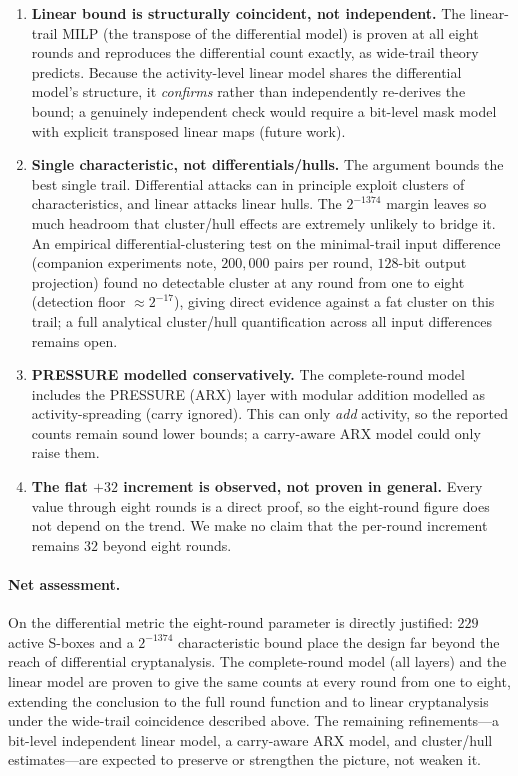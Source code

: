 \documentclass[11pt,a4paper]{article}
\begin{document}
\begin{enumerate}\itemsep3pt
  \item \textbf{Linear bound is structurally coincident, not independent.} The
        linear-trail MILP (the transpose of the differential model) is proven at
        all eight rounds and reproduces the differential count exactly, as
        wide-trail theory predicts. Because the activity-level linear model shares
        the differential model's structure, it \emph{confirms} rather than
        independently re-derives the bound; a genuinely independent check would
        require a bit-level mask model with explicit transposed linear maps
        (future work).

  \item \textbf{Single characteristic, not differentials/hulls.} The argument
        bounds the best single trail. Differential attacks can in principle
        exploit clusters of characteristics, and linear attacks linear hulls. The
        $2^{-1374}$ margin leaves so much headroom that cluster/hull effects are
        extremely unlikely to bridge it. An empirical differential-clustering test
        on the minimal-trail input difference (companion experiments note,
        $200{,}000$ pairs per round, $128$-bit output projection) found no
        detectable cluster at any round from one to eight (detection floor
        $\approx 2^{-17}$), giving direct evidence against a fat cluster on this
        trail; a full analytical cluster/hull quantification across all
        input differences remains open.

  \item \textbf{PRESSURE modelled conservatively.} The complete-round model
        includes the PRESSURE (ARX) layer with modular addition modelled as
        activity-spreading (carry ignored). This can only \emph{add} activity, so
        the reported counts remain sound lower bounds; a carry-aware ARX model
        could only raise them.

  \item \textbf{The flat $+32$ increment is observed, not proven in general.}
        Every value through eight rounds is a direct proof, so the eight-round
        figure does not depend on the trend. We make no claim that the per-round
        increment remains $32$ beyond eight rounds.
\end{enumerate}

\paragraph{Net assessment.}
On the differential metric the eight-round parameter is directly justified:
$229$ active S-boxes and a $2^{-1374}$ characteristic bound place the design far
beyond the reach of differential cryptanalysis. The complete-round model (all
layers) and the linear model are proven to give the same counts at every round
from one to eight, extending the conclusion to the full round function and to
linear cryptanalysis under the wide-trail coincidence described above. The
remaining refinements---a bit-level independent linear model, a carry-aware ARX
model, and cluster/hull estimates---are expected to preserve or strengthen the
picture, not weaken it.
\end{document}
